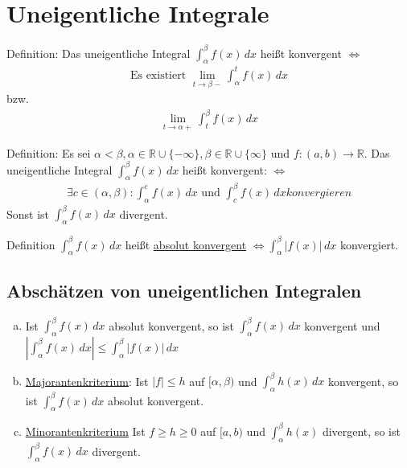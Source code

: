 \section{Uneigentliche Integrale}
Definition: Das uneigentliche Integral $\int_\alpha^\beta f(x)\,dx$ heißt konvergent $\Leftrightarrow$ 
\begin{align*}
    \text{Es existiert } \lim \limits_{t \to \beta -} \int_\alpha^t f(x)\,dx
\end{align*}
bzw.
\begin{align*}
    \lim \limits_{t \to \alpha +} \int_t^\beta f(x)\,dx
\end{align*}

Definition: Es sei $\alpha < \beta, \alpha \in \mathbb{R} \cup \{-\infty\}, \beta \in \mathbb{R} \cup \{\infty\}$ und 
$f:(a,b) \to \mathbb{R}$. Das uneigentliche Integral $\int_\alpha^\beta f(x)\,dx$ heißt konvergent: $\Leftrightarrow$
\begin{align*}
    \exists c \in (\alpha, \beta): \int_\alpha^c f(x)\,dx \text{ und } \int_c^\beta f(x)\,dx konvergieren
\end{align*}
Sonst ist $\int_\alpha^\beta f(x)\,dx$ divergent.

Definition $\int_\alpha^\beta f(x)\,dx$ heißt \underline{absolut konvergent} $\Leftrightarrow \int_\alpha^\beta |f(x)|\,dx$ konvergiert.

\subsection{Abschätzen von uneigentlichen Integralen}
\begin{enumerate} [a)]
    \item Ist $\int_\alpha^\beta f(x)\,dx$ absolut konvergent, so ist $\int_\alpha^\beta f(x)\,dx$ konvergent und 
    $|\int_\alpha^\beta f(x)\,dx| \leq \int_\alpha^\beta |f(x)|\,dx$
    \item \underline{Majorantenkriterium}: Ist $|f| \leq h$ auf $[\alpha,\beta)$ und $\int_\alpha^\beta h(x)\,dx$ konvergent, so ist
    $\int_\alpha^\beta f(x)\,dx$ absolut konvergent.
    \item \underline{Minorantenkriterium} Ist $f\geq h \geq 0$ auf $[a,b)$ und $\int_\alpha^\beta h(x)$ divergent, so ist 
    $\int_\alpha^\beta f(x)\,dx$ divergent.
\end{enumerate}